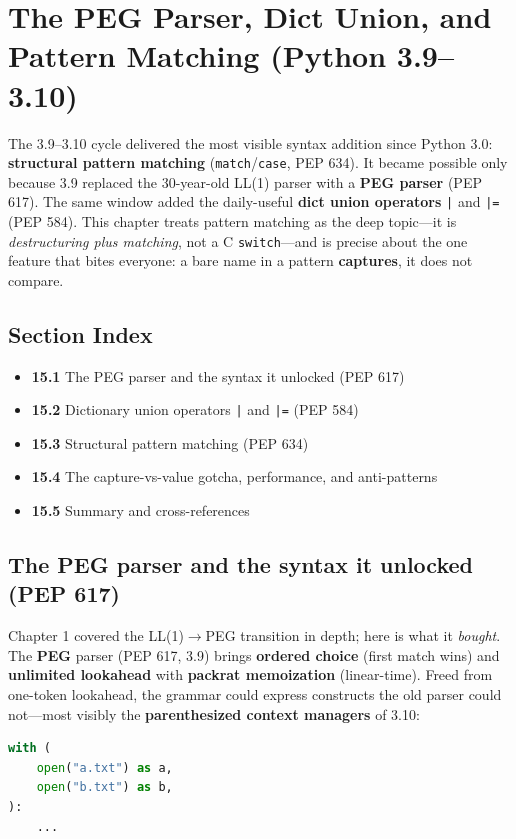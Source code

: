 \chapter{The PEG Parser, Dict Union, and Pattern Matching (Python 3.9--3.10)}

The 3.9--3.10 cycle delivered the most visible syntax addition since Python 3.0: \textbf{structural
pattern matching} (\texttt{match}/\texttt{case}, PEP 634). It became possible only because 3.9
replaced the 30-year-old LL(1) parser with a \textbf{PEG parser} (PEP 617). The same window added
the daily-useful \textbf{dict union operators} \texttt{|} and \texttt{|=} (PEP 584). This chapter
treats pattern matching as the deep topic---it is \emph{destructuring plus matching}, not a C
\texttt{switch}---and is precise about the one feature that bites everyone: a bare name in a pattern
\textbf{captures}, it does not compare.

\section*{Section Index}
\begin{itemize}
  \item \textbf{15.1} The PEG parser and the syntax it unlocked (PEP 617)
  \item \textbf{15.2} Dictionary union operators \texttt{|} and \texttt{|=} (PEP 584)
  \item \textbf{15.3} Structural pattern matching (PEP 634)
  \item \textbf{15.4} The capture-vs-value gotcha, performance, and anti-patterns
  \item \textbf{15.5} Summary and cross-references
\end{itemize}

\section{The PEG parser and the syntax it unlocked (PEP 617)}

Chapter 1 covered the LL(1)$\to$PEG transition in depth; here is what it \emph{bought}. The
\textbf{PEG} parser (PEP 617, 3.9) brings \textbf{ordered choice} (first match wins) and
\textbf{unlimited lookahead} with \textbf{packrat memoization} (linear-time). Freed from one-token
lookahead, the grammar could express constructs the old parser could not---most visibly the
\textbf{parenthesized context managers} of 3.10:

\begin{lstlisting}[language=Python, caption={Parenthesized, multi-line context managers --- only parseable with PEG lookahead.}]
with (
    open("a.txt") as a,
    open("b.txt") as b,
):
    ...
\end{lstlisting}

